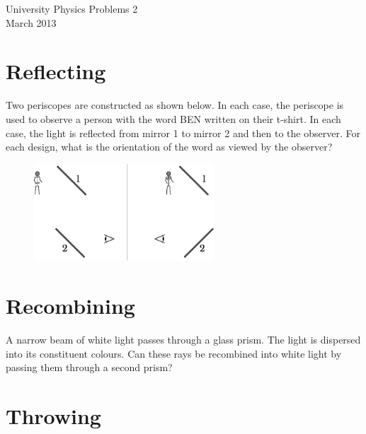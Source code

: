 
\makeatletter
\renewcommand{\@maketitle}{
\newpage
 \null
 \vskip 2em%
 \begin{center}%
  {\Large \@title \par}%
 \end{center}%
 \par} \makeatother

\begin{center}
\Huge University Physics Problems 2\\[1em]
\large March 2013
\end{center}

\section{Reflecting}
	Two periscopes are constructed as shown below. In each case, the periscope is used to observe a person with the word BEN written on their t-shirt. In each case, the light is reflected from mirror 1 to mirror 2 and then to the observer. For each design, what is the orientation of the word as viewed by the observer?
	\begin{figure}[ht]
	  \centering
	  \includegraphics[width=0.6\textwidth]{periscopes.pdf}
	\end{figure}

\section{Recombining}
	A narrow beam of white light passes through a glass prism. The light is dispersed into its constituent colours. Can these rays be recombined into white light by passing them through a second prism?

\section{Throwing}
